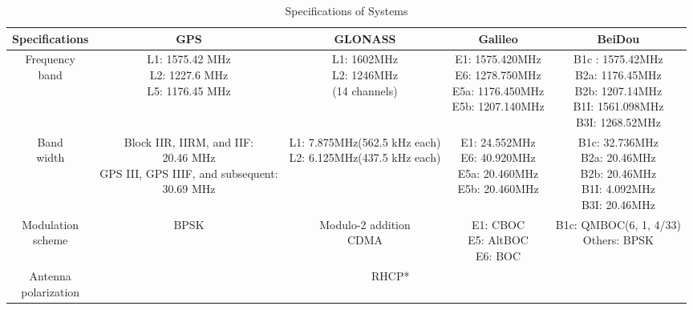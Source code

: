\begin{landscape}
\begin{center}
\begin{table}
    \centering
    \caption{Specifications of Systems}\label{tab:spec_gnss}
    \begin{tabular}{ccccc}
    \toprule
    Specifications & GPS & GLONASS & Galileo & BeiDou\\
    \midrule
    \thead{Frequency\\band} & \thead{L1: 1575.42 MHz\\L2: 1227.6 MHz\\L5: 1176.45 MHz} & \thead{L1: 1602MHz\\L2: 1246MHz\\(14 channels)} & \thead{E1: 1575.420MHz\\E6: 1278.750MHz\\E5a: 1176.450MHz\\E5b: 1207.140MHz} & \thead{B1c : 1575.42MHz\\B2a: 1176.45MHz\\B2b: 1207.14MHz\\B1I: 1561.098MHz\\B3I: 1268.52MHz}\\
    \thead{Band\\width} & \thead{Block IIR, IIRM, and IIF:\\20.46 MHz\\GPS III, GPS IIIF, and subsequent:\\30.69 MHz} & \thead{L1: 7.875MHz(562.5 kHz each)\\L2: 6.125MHz(437.5 kHz each)} & \thead{E1: 24.552MHz\\E6: 40.920MHz\\E5a: 20.460MHz\\E5b: 20.460MHz} & \thead{B1c: 32.736MHz\\B2a: 20.46MHz\\B2b: 20.46MHz\\B1I: 4.092MHz\\B3I: 20.46MHz}\\
    \thead{Modulation\\scheme} & BPSK & \thead{Modulo-2 addition\\CDMA}& \thead{E1: CBOC\\E5: AltBOC\\E6: BOC} & \thead{B1c: QMBOC(6, 1, 4/33)\\Others: BPSK}\\
    \thead{Antenna\\polarization} & \multicolumn{4}{c}{RHCP*}\\

\end{tabular}
\end{table}
\end{center}
\end{landscape}
